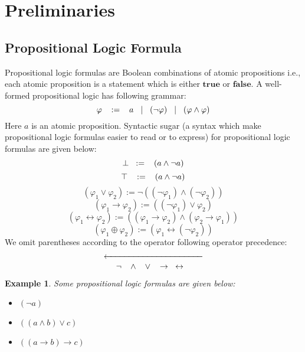 \newtheorem{example}{Example}
\section{Preliminaries}
\label{sec:preliminaries}
\subsection{Propositional Logic Formula}
Propositional logic formulas are Boolean combinations of atomic propositions i.e., each atomic proposition is a statement which is either $\mathbf{true}$ or $\mathbf{false}$. A well-formed propositional logic has following grammar:
$$\varphi\hspace{3mm} :=\hspace{3mm} a\hspace{3mm} |\hspace{3mm} (\neg \varphi)\hspace{3mm} |\hspace{3mm} (\varphi \wedge \varphi)$$
Here $a$ is an atomic proposition.\newline
Syntactic sugar (a syntax which make propositional logic formulas easier to read or to express) for propositional logic formulas are given below:
$$\perp\hspace{3mm}:=\hspace{3mm}(a\wedge\neg a)$$
$$\top\hspace{3mm}:=\hspace{3mm}(a\wedge\neg a)$$
$$(\varphi_{1}\vee\varphi_{2}) := \neg((\neg \varphi_{1}) \wedge (\neg \varphi_{2})) $$
$$(\varphi_{1}\rightarrow\varphi_{2}) := ((\neg \varphi_{1}) \vee \varphi_{2}) $$
$$(\varphi_{1}\leftrightarrow\varphi_{2}) := ( (\varphi_{1}\rightarrow\varphi_{2}) \wedge (\varphi_{2}\rightarrow\varphi_{1}))$$
$$(\varphi_{1}\oplus\varphi_{2}) := (\varphi_{1} \leftrightarrow (\neg \varphi_{2})) $$
We omit parentheses according to the operator following operator precedence:
\[ \xleftarrow{\hspace*{4cm}} \]
$$\neg\hspace{3mm} \wedge\hspace{3mm} \vee\hspace{3mm} \rightarrow\hspace{3mm} \leftrightarrow\hspace{3mm} $$
\begin{example}
	Some propositional logic formulas are given below:
	\begin{itemize}
	\item $(\neg a)$
	\item $((a\wedge b)\vee c)$
	\item $((a\rightarrow b)\rightarrow c)$
	\end{itemize}
\end{example}
